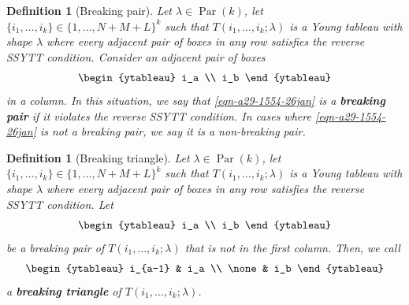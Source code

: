 \documentclass[12pt,reqno,a4paper]{amsart}
\numberwithin{equation}{section}
\newtheorem{dfn}[thm]{Definition}
\theoremstyle{definition}
\begin{document}
\begin{dfn}[Breaking pair]
Let $\lambda \in \operatorname{Par}(k)$, let $\{i_1,\dots,i_k\} \in \{1,\dots,N+M+L\}^k$ such that $T(i_1,\dots,i_k;\lambda)$ is a Young tableau with shape $\lambda$ where every adjacent pair of boxes in any row satisfies the reverse SSYTT condition. Consider an adjacent pair of boxes 
\begin{align}
	\begin{ytableau}
		i_a
		\\
		i_b
	\end{ytableau}
	\label{eqn-a29-1554-26jan}
\end{align}
in a column. In this situation, we say that \eqref{eqn-a29-1554-26jan} is a \textbf{breaking pair} if it violates the reverse SSYTT condition. In cases where \eqref{eqn-a29-1554-26jan} is not a breaking pair, we say it is a non-breaking pair. 
\end{dfn}

\begin{dfn}[Breaking triangle]
Let $\lambda \in \operatorname{Par}(k)$, let $\{i_1,\dots,i_k\} \in \{1,\dots,N+M+L\}^k$ such that $T(i_1,\dots,i_k;\lambda)$ is a Young tableau with shape $\lambda$ where every adjacent pair of boxes in any row satisfies the reverse SSYTT condition. Let 
\begin{align}
	\begin{ytableau}
		i_a
		\\
		i_b
	\end{ytableau}
\end{align}
be a breaking pair of $T(i_1,\dots,i_k;\lambda)$ that is not in the first column. Then, we call 
\begin{align}
	\begin{ytableau}
		i_{a-1} & i_a
		\\
		\none & i_b
	\end{ytableau}
\end{align}
a \textbf{breaking triangle} of $T(i_1,\dots,i_k;\lambda)$. 
\end{dfn}
\end{document}
